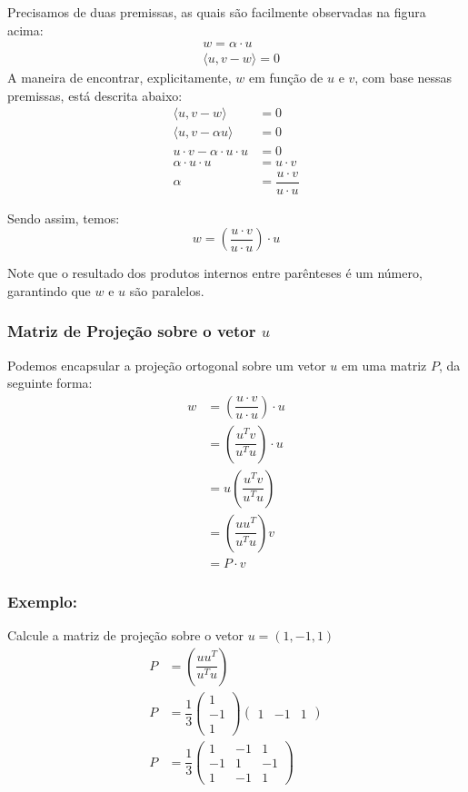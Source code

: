\documentclass[12pt]{article}
\begin{document}
	Precisamos de duas premissas, as quais são facilmente observadas na figura acima:
	\begin{align*}
		&w=\alpha\cdot u\\
		&\langle u,v-w \rangle=0
	\end{align*}
	A maneira de encontrar, explicitamente, $w$ em função de $u$ e $v$, com base nessas premissas, está descrita abaixo:
	\begin{align*}
		\langle u,v-w \rangle&=0\\
		\langle u,v-\alpha u \rangle&=0\\
		u\cdot v - \alpha\cdot u\cdot u&=0\\
		\alpha\cdot u\cdot u&=u\cdot v\\
		\alpha&=\dfrac{u\cdot v}{u\cdot u}
	\end{align*}
	
	Sendo assim, temos:
	\begin{equation*}
		w=\left(\dfrac{u\cdot v}{u\cdot u}\right) \cdot u
	\end{equation*}
	
	Note que o resultado dos produtos internos entre parênteses é um número, garantindo que $w$ e $u$ são paralelos.
	
	\subsubsection{Matriz de Projeção sobre o vetor $u$}
	
	
	Podemos encapsular a projeção ortogonal sobre um vetor $u$ em uma matriz $P$, da seguinte forma:
	\begin{align*}
		w&=\left(\dfrac{u\cdot v}{u\cdot u}\right) \cdot u\\
		&=\left(\dfrac{u^{T} v}{u^{T} u}\right) \cdot u\\
		&=u\left(\dfrac{u^{T} v}{u^{T} u}\right)\\
		&=\left(\dfrac{u u^{T}}{u^{T} u}\right)v\\
		&=P\cdot v
	\end{align*}
	
	\subsubsection{Exemplo:}
	Calcule a matriz de projeção sobre o vetor $u=(1,-1,1)$
	\begin{align*}
		P&=\left(\dfrac{u u^{T}}{u^{T} u}\right)\\
		P&=\dfrac{1}{3}\begin{pmatrix}
			1 \\
			-1 \\
			1
		\end{pmatrix}\begin{pmatrix}
			1 & -1 & 1
		\end{pmatrix}\\
		P&=\dfrac{1}{3}\begin{pmatrix}
			1 & -1 & 1\\
			-1 & 1 & -1\\ 
			1 & -1 & 1
		\end{pmatrix}
	\end{align*}
	
\end{document}
